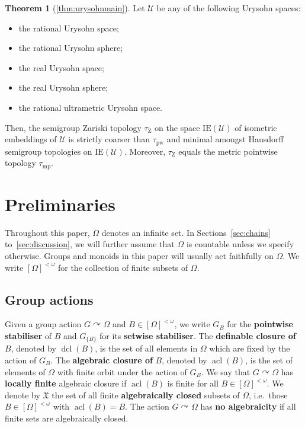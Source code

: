 \documentclass{article}
\theoremstyle{remark}
\theoremstyle{definition}
\newtheorem{thmx}{Theorem}
\def\acts{\curvearrowright}
\DeclareMathOperator{\acl}{acl}
\DeclareMathOperator{\dcl}{dcl}
\newcommand{\U}[0]{\mathbb{U}}
\renewcommand{\U}[0]{\mathcal{U}}
\newcommand{\pw}[0]{\tau_{\mathrm{pw}}}
\newcommand{\zar}[0]{\tau_{\mathrm{Z}}}
\newcommand{\mpw}[0]{\tau_{\mathrm{mp}}}
\newcommand{\X}[0]{\mathfrak{X}}
\newcommand{\fps}[1]{[#1]^{<\omega}}
\begin{document}
{{\begin{thmx}[{\cref{thm:urysohnmain}}] \label{mainthm: d}Let $\U$ be any of the following Urysohn spaces:
\begin{itemize}
    \item the rational Urysohn space;
    \item the rational Urysohn sphere;
    \item the real Urysohn space;
    \item the real Urysohn sphere;
    \item the rational ultrametric Urysohn space.
\end{itemize}
Then, the semigroup Zariski topology $\zar$ on the space $\mathrm{IE}(\U)$ of isometric embeddings of $\U$ is strictly coarser than $\pw$ and  
minimal amongst Hausdorff semigroup topologies on $\mathrm{IE}(\U)$. Moreover, $\zar$ %
{equals} the metric pointwise topology $\mpw$.
\end{thmx}


\section{Preliminaries}\label{sect:prelims}

{Throughout this paper, $\Omega$ denotes an infinite set. In Sections~\ref{sec:chains} to~\ref{sec:discussion}, we will further assume that $\Omega$ is countable unless we specify otherwise.}
Groups and monoids in this paper will 
usually act {faithfully} on $\Omega$. We write $\fps{\Omega}$ for the collection of finite subsets of $\Omega$.


\subsection{Group actions}

Given a group action  $G\acts\Omega$ and $B\in[\Omega]^{<\omega}$, we write $G_B$ for the \textbf{pointwise stabiliser} of $B$ and $G_{\{B\}}$ for its \textbf{setwise stabiliser}. The \textbf{definable closure of} $B$, denoted by $\dcl(B)$,  is the set of all elements in $\Omega$ which are fixed by the action of 
$G_B$.  The \textbf{algebraic closure of} $B$, denoted by $\acl(B)$, is the set of elements of $\Omega$ with finite orbit under the action of $G_B$.  %
We say that $G\acts\Omega$ has \textbf{locally finite} algebraic closure if $\acl(B)$ is finite for all  $B\in[\Omega]^{<\omega}$.
We denote by $\X$ the set of all finite  \textbf{algebraically closed} subsets of $\Omega$, i.e.~those $B\in[\Omega]^{<\omega}$ with $\acl(B)=B$. {The action $G\acts\Omega$ has \textbf{no algebraicity} if all finite sets are algebraically closed.}\\ 






}}
\end{document}

